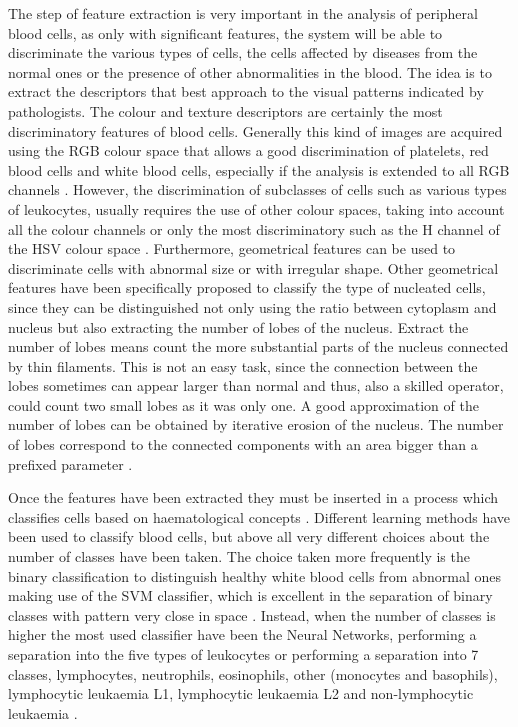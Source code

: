 \documentclass[final,a4paper,12pt,english]{UnicaPhdThesis3}
\begin{document}
The step of feature extraction is very important in the analysis of peripheral blood cells, as only with significant features, the system will be able to discriminate the various types of cells, the cells affected by diseases from the normal ones or the presence of other abnormalities in the blood. The idea is to extract the descriptors that best approach to the visual patterns indicated by pathologists. The colour and texture descriptors are certainly the most discriminatory features of blood cells. Generally this kind of images are acquired using the RGB colour space that allows a good discrimination of platelets, red blood cells and white blood cells, especially if the analysis is extended to all RGB channels \cite{Angulo}. However, the discrimination of subclasses of cells such as various types of leukocytes, usually requires the use of other colour spaces, taking into account all the colour channels or only the most discriminatory such as the H channel of the HSV colour space \cite{Hengen}. Furthermore, geometrical features can be used to discriminate cells with abnormal size or with irregular shape. Other geometrical features have been specifically proposed to classify the type of nucleated cells, since they can be distinguished not only using the ratio between cytoplasm and nucleus \cite{Piuri, Sco05, Sco06} but also extracting the number of lobes of the nucleus. Extract the number of lobes means count the more substantial parts of the nucleus connected by thin filaments. This is not an easy task, since the connection between the lobes sometimes can appear larger than normal and thus, also a skilled operator, could count two small lobes as it was only one. A good approximation of the number of lobes can be obtained by iterative erosion of the nucleus. The number of lobes correspond to the connected components with an area bigger than a prefixed parameter \cite{Piuri}.  

Once the features have been extracted they must be inserted in a process which classifies cells based on haematological concepts \cite{Biondi, Serbouti}. Different learning methods have been used to classify blood cells, but above all very different choices about the number of classes have been taken. The choice taken more frequently is the binary classification to distinguish healthy white blood cells from abnormal ones making use of the SVM classifier, which is excellent in the separation of binary classes with pattern very close in space \cite{Mohapatra10a, Mohapatra10b, Mohapatra10c, Mohapatra14}. Instead, when the number of classes is higher the most used classifier have been the Neural Networks, performing a separation into the five types of leukocytes \cite{Sco06} or performing a separation into 7 classes, lymphocytes, neutrophils, eosinophils, other (monocytes and basophils), lymphocytic leukaemia L1, lymphocytic leukaemia L2 and non-lymphocytic leukaemia \cite{Buavirat}. 
\end{document}
